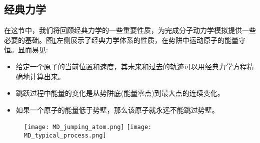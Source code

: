 \subsection{经典力学}
在这节中，我们将回顾经典力学的一些重要性质，为完成分子动力学模拟提供一些必要的基础。图\ref{MD_typical}左侧展示了经典力学体系的性质，在势阱中运动原子的能量守恒。显而易见:~
\begin{itemize}
	\item 给定一个原子的当前位置和速度，其未来和过去的轨迹可以用经典力学方程精确地计算出来。
	\item 跳跃过程中能量的变化是从势阱底(能量零点)到最大点的连续变化。
	\item 如果一个原子的能量低于势壁，那么该原子就永远不能跳过势壁。
\end{itemize}
\begin{figure}[h!]
\centering
\vspace*{-0.1in}
\texttt{[image: MD\_jumping\_atom.png]}
\texttt{[image: MD\_typical\_process.png]}
\caption{\fontsize{7.2pt}{4.2pt}}%
\label{MD_typical}
\end{figure}

